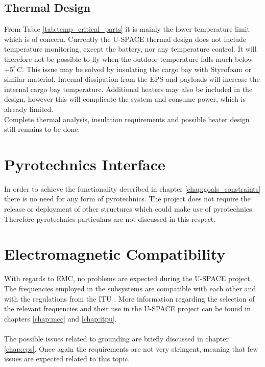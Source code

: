\subsection{Thermal Design}
From Table \ref{tab:temp_critical_parts} it is mainly the lower temperature limit which is of concern. Currently the \ac{U-SPACE} thermal design does not include temperature monitoring, except the battery, nor any temperature control. It will therefore not be possible to fly when the outdoor temperature falls much below $+5^{\circ}\,C$. This issue may be solved by insulating the cargo bay with Styrofoam or similar material. Internal dissipation from the \ac{EPS} and payloads will increase the internal cargo bay temperature. Additional heaters may also be included in the design, however this will complicate the system and consume power, which is already limited.\\[5mm]
Complete thermal analysis, insulation requirements and possible heater design still remains to be done.
%
\section{Pyrotechnics Interface}

In order to achieve the functionality described in chapter \ref{chap:goals_constraints} there is no need for any form of pyrotechnics. The project does not require the release or deployment of other structures which could make use of pyrotechnics. Therefore pyrotechnics particulars are not discussed in this respect.

\section{Electromagnetic Compatibility}

With regards to \ac{EMC}, no problems are expected during the \ac{U-SPACE} project. The frequencies employed in the subsystems are compatible with each other and with the regulations from the \ac{ITU} \cite{book:freqalloc}. More information regarding the selection of the relevant frequencies and their use in the \ac{U-SPACE} project can be found in chapters \ref{chap:mcc} and \ref{chap:itpu}.
\\
\\
The possible issues related to grounding are briefly discussed in chapter \ref{chap:eps}. Once again the requirements are not very stringent, meaning that few issues are expected related to this topic.